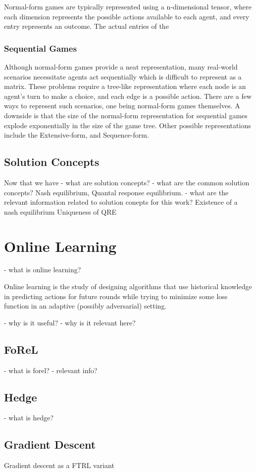 Normal-form games are typically represented using a n-dimensional tensor, where each dimension
represents the possible actions available to each agent, and every entry represents an outcome.
The actual entries of the

\subsubsection*{Sequential Games}

Although normal-form games provide a neat representation, many real-world scenarios necessitate
agents act sequentially which is difficult to represent as a matrix.
These problems require a tree-like representation where each node is an agent's turn to make a
choice, and each edge is a possible action.
There are a few ways to represent such scenarios, one being normal-form games themselves.
A downside is that the size of the normal-form representation for sequential games explode
exponentially in the size of the game tree.
Other possible representations include the Extensive-form, and Sequence-form.

\begin{definition}
\end{definition}

\begin{definition}
\end{definition}

\subsection{Solution Concepts}

Now that we have - what are solution concepts?
- what are the common solution concepts?
Nash equilibrium, Quantal response equilibrium.
- what are the relevant information related to solution conepts for this work?
Existence of a nash equilibrium Uniqueness of QRE

\section{Online Learning}

- what is online learning?

Online learning is the study of designing algorithms that use historical knowledge in predicting
actions for future rounds while trying to minimize some loss function in an adaptive (possibly
adversarial) setting.

- why is it useful?
- why is it relevant here?

\subsection{FoReL}\label{sec:forel}
- what is forel?
- relevant info?

\subsection{Hedge}
- what is hedge?

\subsection{Gradient Descent}
Gradient descent as a FTRL variant